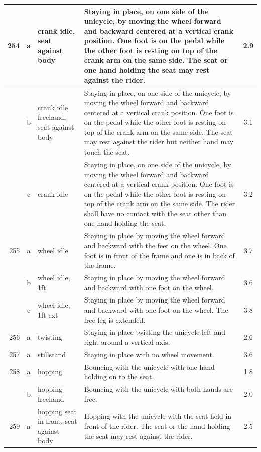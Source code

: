 \begin{longtable}{|r|c|p{4cm}|p{8cm}|c|}
\hline
254 & a & crank idle, seat against body & Staying in place, on one side of the unicycle, by moving the wheel forward and backward centered at a vertical crank position. One foot is on the pedal while the other foot is resting on top of the crank arm on the same side. The seat or one hand holding the seat may rest against the rider. & 2.9 \\ 
\hline
  & b & crank idle freehand, seat against body  & Staying in place, on one side of the unicycle, by moving the wheel forward and backward centered at a vertical crank position. One foot is on the pedal while the other foot is resting on top of the crank arm on the same side. The seat may rest against the rider but neither hand may touch the seat.  & 3.1 \\ 
\hline
  & c & crank idle  & Staying in place, on one side of the unicycle, by moving the wheel forward and backward centered at a vertical crank position. One foot is on the pedal while the other foot is resting on top of the crank arm on the same side. The rider shall have no contact with the seat other than one hand holding the seat. & 3.2 \\ 
\hline
255 & a & wheel idle  & Staying in place by moving the wheel forward and backward with the feet on the wheel. One foot is in front of the frame and one is in back of the frame.  & 3.7 \\ 
\hline
  & b & wheel idle, 1ft & Staying in place by moving the wheel forward and backward with one foot on the wheel. & 3.6 \\ 
\hline
  & c & wheel idle, 1ft ext & Staying in place by moving the wheel forward and backward with one foot on the wheel. The free leg is extended. & 3.8 \\ 
\hline
256 & a & twisting  & Staying in place twisting the unicycle left and right around a vertical axis. & 2.6 \\ 
\hline
257 & a & stillstand  & Staying in place with no wheel movement.  & 3.6 \\ 
\hline
258 & a & hopping & Bouncing with the unicycle with one hand holding on to the seat.  & 1.8 \\ 
\hline
  & b & hopping freehand  & Bouncing with the unicycle with both hands are free.  & 2.0 \\ 
\hline
259 & a & hopping seat in front, seat against body  & Hopping with the unicycle with the seat held in front of the rider. The seat or the hand holding the seat may rest against the rider. & 2.5 \\ 
\hline

\end{longtable}
